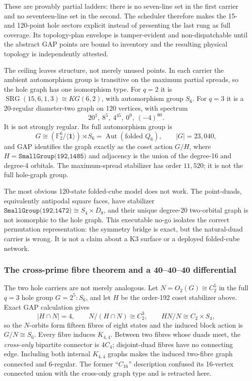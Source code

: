 \documentclass[11pt,letterpaper]{article}
\newcommand{\tagbox}[3]{\tikz[baseline=(X.base)]{\node[inner xsep=3.5pt,inner ysep=1.4pt,rounded corners=1.6pt,fill=#1,text=#2,font=\bfseries\sffamily\tiny] (X) {#3};}}
\newcommand{\PROVED}{\tagbox{greenlite}{green!45!black}{PROVED}}
\begin{document}
These are provably partial ladders: there is no seven-line set in the first
carrier and no seventeen-line set in the second. The scheduler therefore makes
the 15- and 120-point hole sectors explicit instead of presenting the last rung
as full coverage. Its topology-plan envelope is tamper-evident and
non-dispatchable until the abstract GAP points are bound to inventory and the
resulting physical topology is independently attested. \PROVED

The ceiling leaves structure, not merely unused points. In each carrier the
ambient automorphism group is transitive on the maximum partial spreads, so the
hole graph has one isomorphism type. For $q=2$ it is
$\operatorname{SRG}(15,6,1,3)\cong KG(6,2)$, with automorphism group $S_6$.
For $q=3$ it is a 20-regular diameter-two graph on 120 vertices, with spectrum
\[
 20^1,\ 8^5,\ 4^{45},\ 0^9,\ (-4)^{60}.
\]
It is not strongly regular. Its full automorphism group is
\[
 G\cong (\mathbb F_2^6/\langle\mathbf 1\rangle)\rtimes S_6
   =\operatorname{Aut}(\text{folded }Q_6),\qquad |G|=23{,}040,
\]
and GAP identifies the graph exactly as the coset action $G/H$, where
$H=\texttt{SmallGroup(192,1485)}$ and adjacency is the union of the
degree-16 and degree-4 orbitals. The maximum-spread stabilizer has order
$11{,}520$; it is not the full hole-graph group. \PROVED

The most obvious 120-state folded-cube model does not work. The point-duads,
equivalently antipodal square faces, have stabilizer
$\texttt{SmallGroup(192,1472)}\cong S_4\times D_8$, and their unique
degree-20 two-orbital graph is not isomorphic to the hole graph. This executable
no-go isolates the correct permutation representation: the symmetry bridge is
exact, but the natural-duad carrier is wrong. It is not a claim about a K3
surface or a deployed folded-cube network. \PROVED

\subsubsection{The cross-prime fibre theorem and a 40--40--40 differential}

The two hole carriers are not merely analogous. Let $N=O_2(G)\cong C_2^5$
in the full $q=3$ hole group $G=2^5{:}S_6$, and let $H$ be the order-192
coset stabilizer above. Exact GAP calculation gives
\[
 |H\cap N|=4,\qquad N/(H\cap N)\cong C_2^3,
 \qquad HN/N\cong C_2\times S_4,
\]
so the $N$-orbits form fifteen fibres of eight states and the induced block
action is $G/N\cong S_6$. Every fibre induces $K_{4,4}$. Between two fibres
whose duads meet, the \emph{cross-only} bipartite connector is $4C_4$;
disjoint-duad fibres have no connecting edge. Including both internal
$K_{4,4}$ graphs makes the induced two-fibre graph connected and 6-regular.
The former ``$C_{16}$'' description confused its 16-vertex connected union
with the cross-only graph type and is retracted here. \PROVED
\end{document}
